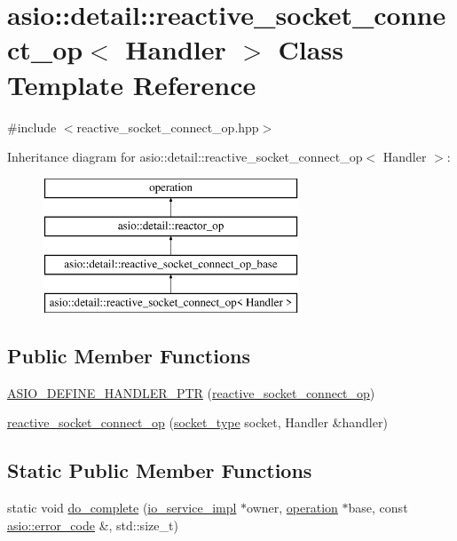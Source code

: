 \hypertarget{classasio_1_1detail_1_1reactive__socket__connect__op}{}\section{asio\+:\+:detail\+:\+:reactive\+\_\+socket\+\_\+connect\+\_\+op$<$ Handler $>$ Class Template Reference}
\label{classasio_1_1detail_1_1reactive__socket__connect__op}


{\ttfamily \#include $<$reactive\+\_\+socket\+\_\+connect\+\_\+op.\+hpp$>$}

Inheritance diagram for asio\+:\+:detail\+:\+:reactive\+\_\+socket\+\_\+connect\+\_\+op$<$ Handler $>$\+:\begin{figure}[H]
\begin{center}
\leavevmode
\includegraphics[height=4.000000cm]{classasio_1_1detail_1_1reactive__socket__connect__op}
\end{center}
\end{figure}
\subsection*{Public Member Functions}
\begin{DoxyCompactItemize}
\item 
\hyperlink{classasio_1_1detail_1_1reactive__socket__connect__op_ab94a8f12fec39d091239e90d597221c0}{A\+S\+I\+O\+\_\+\+D\+E\+F\+I\+N\+E\+\_\+\+H\+A\+N\+D\+L\+E\+R\+\_\+\+P\+T\+R} (\hyperlink{classasio_1_1detail_1_1reactive__socket__connect__op}{reactive\+\_\+socket\+\_\+connect\+\_\+op})
\item 
\hyperlink{classasio_1_1detail_1_1reactive__socket__connect__op_a538c47b6b1404a25776b9968f0a1f380}{reactive\+\_\+socket\+\_\+connect\+\_\+op} (\hyperlink{namespaceasio_1_1detail_a6798c771dd84b79798b1a08150706ea9}{socket\+\_\+type} socket, Handler \&handler)
\end{DoxyCompactItemize}
\subsection*{Static Public Member Functions}
\begin{DoxyCompactItemize}
\item 
static void \hyperlink{classasio_1_1detail_1_1reactive__socket__connect__op_ab46ada7c1ae3b640c2de3bb1fdb2d8c5}{do\+\_\+complete} (\hyperlink{namespaceasio_1_1detail_a6d61d9b8e53c11288be549d82aec5a42}{io\+\_\+service\+\_\+impl} $\ast$owner, \hyperlink{namespaceasio_1_1detail_a338968609bec20e37145309f8f9ec936}{operation} $\ast$base, const \hyperlink{classasio_1_1error__code}{asio\+::error\+\_\+code} \&, std\+::size\+\_\+t)
\end{DoxyCompactItemize}
